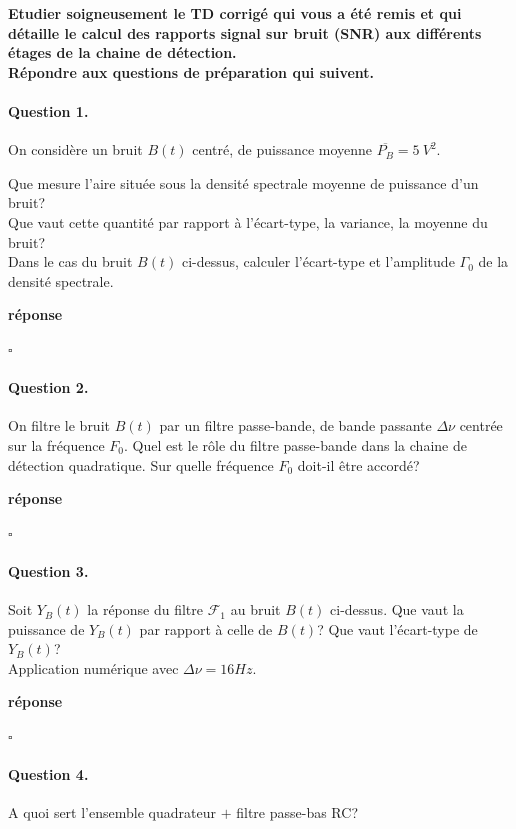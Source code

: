 \documentclass{article}
\newcommand{\dnu}{16}
\newcommand{\debutrep}[1]{\color{blue}\begin{center} \hrulefill \textbf{ #1 } \hrulefill \end{center} }
\newcommand{\finrep}{\vspace*{5mm}\hfill $\square$\color{black}\vspace*{5mm}}
\begin{document}
\textbf{ Etudier soigneusement le TD corrigé qui vous a été remis et qui détaille le calcul des rapports signal sur bruit (SNR)  aux différents étages de la chaine de détection. \\
Répondre aux questions de préparation qui suivent.
}

\paragraph{Question 1.}
On considère un bruit $B(t)$ centré, de puissance moyenne $\overline{P_B} = 5~V^2$.

Que mesure l'aire située sous la densité spectrale moyenne de puissance d'un bruit? \\
Que vaut cette quantité par rapport à l'écart-type, la variance, la moyenne du bruit? \\
Dans le cas du bruit $B(t)$ ci-dessus, calculer l'écart-type et l'amplitude $\Gamma_0$ de la densité spectrale.

\debutrep{réponse}

\finrep

\paragraph{Question 2.} 
On filtre le bruit $B(t)$ par un filtre passe-bande, de bande passante  $\Delta\nu$ centrée sur  la fréquence  $F_0$. 
Quel est le rôle du filtre passe-bande dans la chaine de détection quadratique. Sur quelle fréquence $F_0$ doit-il être accordé?

\debutrep{réponse}

\finrep

\paragraph{Question 3.} Soit $Y_B(t)$ la réponse du filtre $\mathcal{F}_1$ au bruit $B(t)$ ci-dessus. Que vaut la puissance de $Y_B(t)$ par rapport à celle de $B(t)$? Que vaut l'écart-type de $Y_B(t)$? \\
Application numérique avec $\Delta\nu = \dnu Hz$. \\

\debutrep{réponse}

\finrep

\paragraph{Question 4.}
A quoi sert l'ensemble {\sc quadrateur} $+$ {\sc filtre passe-bas RC}?
\end{document}
